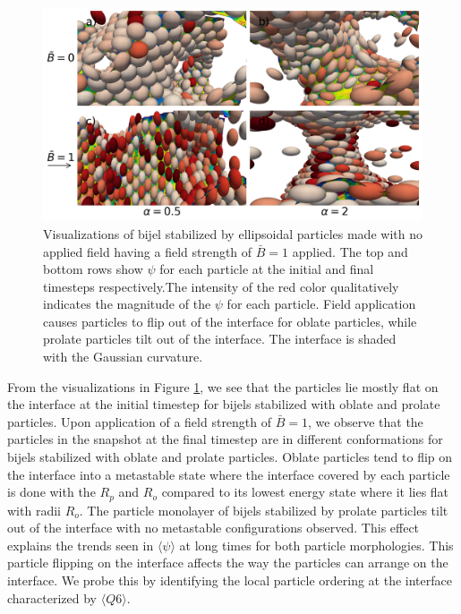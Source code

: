 \begin{figure} 
    \centering 
    \includegraphics[scale=0.4]{../figures/results/paper2/psi_concat_startB-0_endB-1.png} 
    \caption{Visualizations of bijel stabilized by ellipsoidal particles made with no applied field having a field strength of $\bar{B} = 1$ applied. The top and bottom 
             rows show $\psi$ for each particle at the initial and final timesteps respectively.The intensity
             of the red color qualitatively indicates the magnitude of the $\psi$ for each particle. Field application causes particles to flip out of the interface for
             oblate particles, while prolate particles tilt out of the interface. The interface is shaded with the Gaussian curvature.} 
    \label{fig:psi_field_on_visualize} 
\end{figure}

From the visualizations in Figure \ref{fig:psi_field_on_visualize}, we see that the particles lie mostly flat on the interface at the initial timestep for bijels
stabilized with oblate and prolate particles. Upon application of a field strength of $\bar{B} = 1$, we observe that the particles in the snapshot at the final timestep 
are in different conformations for bijels stabilized with oblate and prolate particles. Oblate particles tend to flip on the interface into a metastable state where
the interface covered by each particle is done with the $R_p$ and $R_o$ compared to its lowest energy state where it lies flat with radii $R_o$. The particle monolayer
of bijels stabilized by prolate particles tilt out of the interface with no metastable configurations observed. This effect explains the trends seen in $\langle \psi \rangle$
at long times for both particle morphologies. This particle flipping on the interface affects the way the particles can arrange on the interface. We probe this by identifying 
the local particle ordering at the interface characterized by $\langle Q6 \rangle$.

